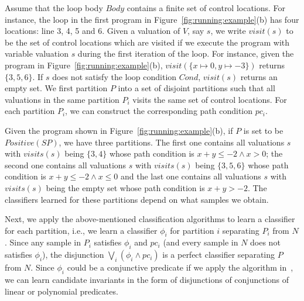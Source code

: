 Assume that the loop body $Body$ contains a finite set of control locations. For instance, the loop in the first program in Figure~\ref{fig:running:example}(b) has four locations: line 3, 4, 5 and 6. Given a valuation of $V$, say $s$, we write $visit(s)$ to be the set of control locations which are visited if we execute the program with variable valuation $s$ during the first iteration of the loop. For instance, given the program in Figure~\ref{fig:running:example}(b), $visit(\{x \mapsto 0, y \mapsto -3\})$ returns $\{3,5,6\}$. If $s$ does not satisfy the loop condition $Cond$, $visit(s)$ returns an empty set. We first partition $P$ into a set of disjoint partitions such that all valuations in the same partition $P_i$ visits the same set of control locations. For each partition $P_i$, we can construct the corresponding path condition $pc_i$.
\begin{example}
Given the program shown in Figure~\ref{fig:running:example}(b), if $P$ is set to be $Positive(SP)$, we have three partitions. The first one contains all valuations $s$ with $visits(s)$ being $\{3,4\}$ whose path condition is $x+y\leq -2 \land x > 0$; the second one contains all valuations $s$ with $visits(s)$ being $\{3,5,6\}$ whose path condition is $x+y\leq -2 \land x \leq 0$ and the last one contains all valuations $s$ with $visits(s)$ being the empty set whose path condition is $x+y > -2$.
The classifiers learned for these partitions depend on what samples we obtain.
\end{example}
Next, we apply the above-mentioned classification algorithms to learn a classifier for each partition, i.e., we learn a classifier $\phi_i$ for partition $i$ separating $P_i$ from $N$. Since any sample in $P_i$ satisfies $\phi_i$ and $pc_i$ (and every sample in $N$ does not satisfies $\phi_i$), the disjunction $\bigvee_i (\phi_i \land pc_i)$ is a perfect classifier separating $P$ from $N$. Since $\phi_i$ could be a conjunctive predicate if we apply the algorithm in~\cite{sharma2012interpolants}, we can learn candidate invariants in the form of disjunctions of conjunctions of linear or polynomial predicates.

